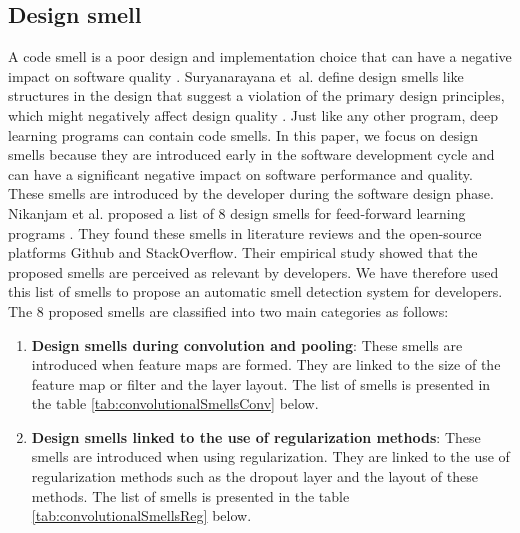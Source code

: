 \subsection{Design smell}
\label{sec:codeSmell}
A code smell is a poor design and implementation choice that can have a negative
impact on software quality \cite{fowler1997refactoring}. Suryanarayana et al.
define design smells like structures in the
design that suggest a violation of the primary design principles, which might
negatively affect design quality \cite{suryanarayana2014refactoring}. Just like any other program, deep learning
programs can contain code smells. In this paper, we focus on design smells
because they are introduced early in the software development cycle and can have
a significant negative impact on software performance and quality. These smells
are introduced by the developer during the software design phase.\\ Nikanjam et
al. proposed a list of 8 design smells for feed-forward learning programs
\cite{nikanjam2021design}. They found these smells in literature reviews and the
open-source platforms Github and StackOverflow. Their empirical study showed
that the proposed smells are perceived as relevant by developers. We have
therefore used this list of smells to propose an automatic smell detection
system for developers.\\ The 8 proposed smells are classified into two main
categories as follows:
\begin{enumerate}
    \item \textbf{Design smells during convolution and pooling}: These smells are
          introduced when feature maps are formed. They are linked to the size of the
          feature map or filter and the layer layout. The list of smells is presented in
          the table \ref{tab:convolutionalSmellsConv} below.
    \item \textbf{Design smells linked to the use of regularization methods}: These
          smells are introduced when using regularization. They are linked to the use of
          regularization methods such as the dropout layer and the layout of these
          methods. The list of smells is presented in the table
          \ref{tab:convolutionalSmellsReg} below.
\end{enumerate}


